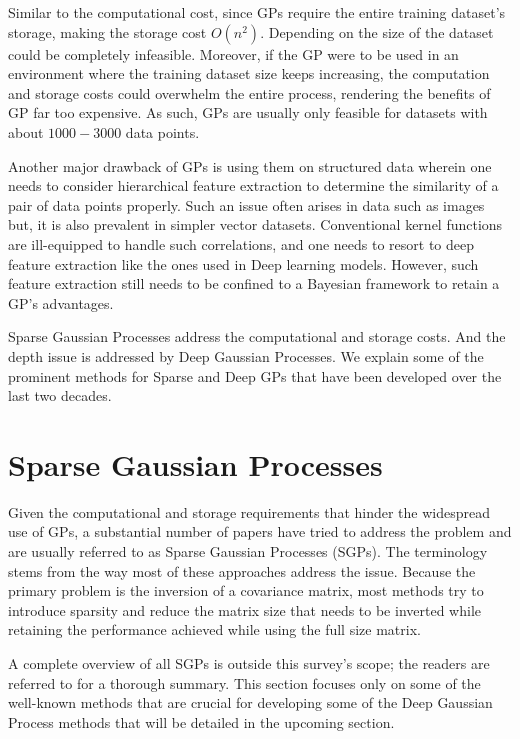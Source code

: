 \documentclass[letterpaper,11pt]{extarticle}
\begin{document}
Similar to the computational cost, since GPs require the entire training dataset's storage, making the storage cost $O(n^2)$. Depending on the size of the dataset could be completely infeasible. Moreover, if the GP were to be used in an environment where the training dataset size keeps increasing, the computation and storage costs could overwhelm the entire process, rendering the benefits of GP far too expensive. As such, GPs are usually only feasible for datasets with about $1000-3000$ data points.

Another major drawback of GPs is using them on structured data wherein one needs to consider hierarchical feature extraction to determine the similarity of a pair of data points properly. Such an issue often arises in data such as images but, it is also prevalent in simpler vector datasets. Conventional kernel functions are ill-equipped to handle such correlations, and one needs to resort to deep feature extraction like the ones used in Deep learning models. However, such feature extraction still needs to be confined to a Bayesian framework to retain a GP's advantages.

Sparse Gaussian Processes address the computational and storage costs. And the depth issue is addressed by Deep Gaussian Processes. We explain some of the prominent methods for Sparse and Deep GPs that have been developed over the last two decades. 

\section{Sparse Gaussian Processes}

Given the computational and storage requirements that hinder the widespread use of GPs, a substantial number of papers have tried to address the problem and are usually referred to as Sparse Gaussian Processes (SGPs). The terminology stems from the way most of these approaches address the issue. Because the primary problem is the inversion of a covariance matrix, most methods try to introduce sparsity and reduce the matrix size that needs to be inverted while retaining the performance achieved while using the full size matrix. 

A complete overview of all SGPs is 
outside this survey's scope; the readers are referred to \cite{LiuOSC20} for a thorough summary. This section focuses only on some of the well-known methods that are crucial for developing some of the Deep Gaussian Process methods that will be detailed in the upcoming section. 
\end{document}
